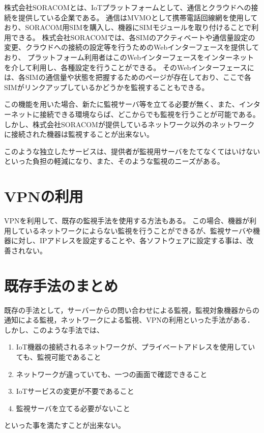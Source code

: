 	株式会社SORACOMとは、IoTプラットフォームとして、通信とクラウドへの接続を提供している企業である。
	通信はMVMOとして携帯電話回線網を使用しており、SORACOM用SIMを購入し、機器にSIMモジュールを取り付けることで利用できる。
	株式会社SORACOMでは、各SIMのアクティベートや通信量設定の変更、クラウドへの接続の設定等を行うためのWebインターフェースを提供しており、
	プラットフォーム利用者はこのWebインターフェースをインターネットを介して利用し、各種設定を行うことができる。
	そのWebインターフェースには、各SIMの通信量や状態を把握するためのページが存在しており、ここで各SIMがリンクアップしているかどうかを監視することもできる。

	この機能を用いた場合、新たに監視サーバ等を立てる必要が無く、また、インターネットに接続できる環境ならば、どこからでも監視を行うことが可能である。
	しかし、株式会社SORACOMが提供しているネットワーク以外のネットワークに接続された機器は監視することが出来ない。

	このような独立したサービスは、提供者が監視用サーバをたてなくてはいけないといった負担の軽減になり、また、そのような監視のニーズがある。

\section{VPNの利用}
	VPNを利用して、既存の監視手法を使用する方法もある。
	この場合、機器が利用しているネットワークによらない監視を行うことができるが、監視サーバや機器に対し、IPアドレスを設定することや、各ソフトウェアに設定する事は、改善されない。

\section{既存手法のまとめ}
	既存の手法として，サーバーからの問い合わせによる監視，監視対象機器からの通知による監視，ネットワークによる監視、VPNの利用といった手法がある．
	しかし、このような手法では、
	\begin{enumerate}
		\item IoT機器の接続されるネットワークが、プライベートアドレスを使用していても、監視可能であること
		\item ネットワークが違っていても、一つの画面で確認できること
		\item IoTサービスの変更が不要であること
		\item 監視サーバを立てる必要がないこと
	\end{enumerate}
	といった事を満たすことが出来ない。

